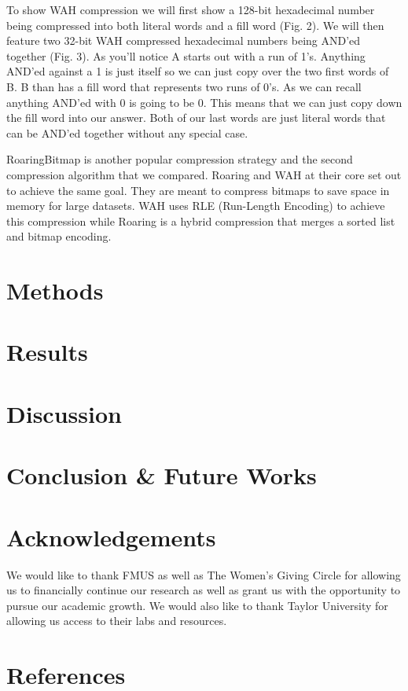 \documentclass{article}
\begin{document}
To show WAH compression we will first show a 128-bit hexadecimal number being compressed into both literal words and a fill word (Fig. 2). We will then feature two 32-bit WAH compressed hexadecimal numbers being AND’ed together (Fig. 3). As you’ll notice A starts out with a run of 1’s. Anything AND’ed against a 1 is just itself so we can just copy over the two first words of B. B than has a fill word that represents two runs of 0’s. As we can recall anything AND’ed with 0 is going to be 0. This means that we can just copy down the fill word into our answer. Both of our last words are just literal words that can be AND’ed together without any special case. \par



RoaringBitmap is another popular compression strategy and the second compression algorithm that we compared. Roaring and WAH at their core set out to achieve the same goal. They are meant to compress bitmaps to save space in memory for large datasets. WAH uses RLE (Run-Length Encoding) to achieve this compression while Roaring is a hybrid compression that merges a sorted list and bitmap encoding. \par

%
%
\section{Methods}
\justify

%
%
\section{Results}
\justify

%
%
\section{Discussion}
\justify

%
%
\section{Conclusion & Future Works}
\justify

%
%
\section{Acknowledgements}
\justify

We would like to thank FMUS as well as The Women’s Giving Circle for allowing us to financially continue our research as well as grant us with the opportunity to pursue our  academic growth. We would also like to thank Taylor University for allowing us access to their labs and resources. \par

%
%
\section{References}
\justify
\end{document}
